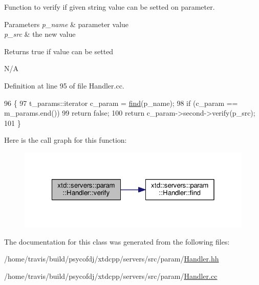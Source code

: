 Function to verify if given string value can be setted on parameter. 


\begin{DoxyParams}{Parameters}
{\em p\-\_\-name} & parameter value \\
\hline
{\em p\-\_\-src} & the new value \\
\hline
\end{DoxyParams}
\begin{DoxyReturn}{Returns}
true if value can be setted
\end{DoxyReturn}
N/\-A 

Definition at line 95 of file Handler.\-cc.


\begin{DoxyCode}
96 \{
97   t\_params::iterator c\_param = \hyperlink{classxtd_1_1servers_1_1param_1_1Handler_a66465c7a1ee0978f7558d55bfd8bd583}{find}(p\_name);
98   \textcolor{keywordflow}{if} (c\_param == m\_params.end())
99     \textcolor{keywordflow}{return} \textcolor{keyword}{false};
100   \textcolor{keywordflow}{return} c\_param->second->verify(p\_src);
101 \}
\end{DoxyCode}


Here is the call graph for this function\-:
\nopagebreak
\begin{figure}[H]
\begin{center}
\leavevmode
\includegraphics[width=320pt]{classxtd_1_1servers_1_1param_1_1Handler_aa2b60f898a67bd55c4289686591a2f3b_cgraph}
\end{center}
\end{figure}




The documentation for this class was generated from the following files\-:\begin{DoxyCompactItemize}
\item 
/home/travis/build/psycofdj/xtdcpp/servers/src/param/\hyperlink{Handler_8hh}{Handler.\-hh}\item 
/home/travis/build/psycofdj/xtdcpp/servers/src/param/\hyperlink{Handler_8cc}{Handler.\-cc}\end{DoxyCompactItemize}

